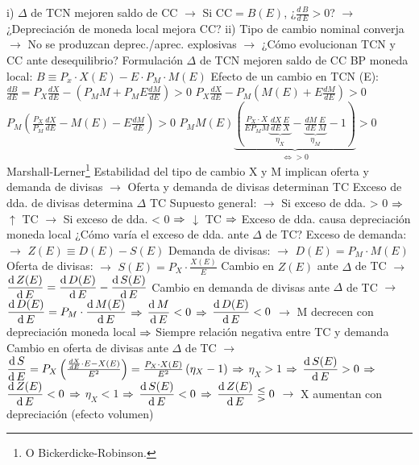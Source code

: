 \documentclass{nuevotema}
\begin{document}
\begin{esquemal}
				\4[] i) $\Delta$ de TCN mejoren saldo de CC
				\4[] $\to$ Si $\text{CC} = B(E)$, ¿$\frac{d \, B}{d \, E} > 0$?
				\4[] $\to$ ¿Depreciación de moneda local mejora CC?
				\4[] ii) Tipo de cambio nominal converja
				\4[] $\to$ No se produzcan deprec./aprec. explosivas
				\4[] $\to$ ¿Cómo evolucionan TCN y CC ante desequilibrio?
			\3 Formulación
				\4[(i)] $\Delta$ de TCN mejoren saldo de CC
				\4[] BP moneda local: $B \equiv P_x \cdot X(E) - E \cdot P_M \cdot M(E)$
				\4[] Efecto de un cambio en TCN (E):
				\4[] $\frac{dB}{dE}=P_X \frac{dX}{dE} - \left( P_M M + P_M E \frac{dM}{dE} \right) > 0$
				\4[] $P_X \frac{dX}{dE} - P_M \left( M(E) + E \frac{dM}{dE} \right) > 0$
				\4[] $P_M \left( \frac{P_X}{P_M} \frac{dX}{dE} - M(E) - E \frac{dM}{dE} \right) > 0$
				\4[] $P_M M(E) \underbrace{\left( \frac{P_X \cdot X}{E P_M M} \underbrace{\frac{dX}{dE} \frac{E}{X}}_{\eta_X} - \underbrace{\frac{dM}{dE} \frac{E}{M}}_{\eta_M} - 1 \right)}_{\iff > 0} > 0$
				\4[(I)] Marshall-Lerner\footnote{O Bickerdicke-Robinson.} 
				\4[(ii)] Estabilidad del tipo de cambio
				\4[] X y M implican oferta y demanda de divisas
				\4[] $\to$ Oferta y demanda de divisas determinan TC
				\4[] Exceso de dda. de divisas determina $\Delta$ TC
				\4[] Supuesto general:
				\4[] $\to$ Si exceso de dda. > 0 $\Rightarrow$ $\uparrow$ TC
				\4[] $\to$ Si exceso de dda. < 0 $\Rightarrow$ $\downarrow$ TC
				\4[] $\Rightarrow$ Exceso de dda. causa depreciación moneda local
				\4[] ¿Cómo varía el exceso de dda. ante $\Delta$ de TC?
				\4[] Exceso de demanda:
				\4[] $\to$ $Z(E) \equiv D(E) - S(E)$
				\4[] Demanda de divisas:
				\4[] $\to$ $D(E) = P_M \cdot M(E)$
				\4[] Oferta de divisas:
				\4[] $\to$ $S(E) = P_X \cdot \frac{X(E)}{E}$
				\4[] Cambio en $Z(E)$ ante $\Delta$ de TC
				\4[] $\to$ $\dfrac{\text{d} \, Z(E)}{\text{d} \, E} = \dfrac{\text{d} \, D(E)}{\text{d} \, E} - \dfrac{\text{d} \, S(E)}{\text{d} \, E}$
				\4[] Cambio en demanda de divisas ante $\Delta$ de TC
				\4[] $\to$ $\dfrac{\text{d} \, D(E)}{\text{d} \, E} = P_M \cdot \dfrac{\text{d} \, M(E)}{\text{d} \, E}$
				\4[] $\Rightarrow$ $\dfrac{\text{d} \, M}{\text{d} \, E} < 0$ $\Rightarrow$ $\dfrac{\text{d} \, D(E)}{\text{d} \, E} < 0$
				\4[] $\to$ M decrecen con depreciación moneda local
				\4[] $\Rightarrow$ Siempre relación negativa entre TC y demanda
				\4[] Cambio en oferta de divisas ante $\Delta$ de TC
				\4[] $\to$ $\dfrac{\text{d} \, S}{\text{d} \, E} = P_X \left( \frac{\frac{d X}{d E}\cdot E - X(E)}{E^2} \right) = \frac{P_X \cdot X(E)}{E^2} \left( \eta_X - 1 \right)$
				\4[] $\Rightarrow$ $\eta_X > 1 $ $\Rightarrow$ $\dfrac{\text{d} \, S(E)}{\text{d} \, E} > 0$ $\Rightarrow$ $\dfrac{\text{d} \, Z(E)}{\text{d} \, E} < 0$
				\4[] $\Rightarrow$ $\eta_X < 1 $ $\Rightarrow$ $\dfrac{\text{d} \, S(E)}{\text{d} \, E} < 0$ $\Rightarrow$ $\dfrac{\text{d} \, Z(E)}{\text{d} \, E} \lesseqgtr 0$
				\4[] $\to$ X aumentan con depreciación (efecto volumen)

\end{esquemal}
\end{document}
